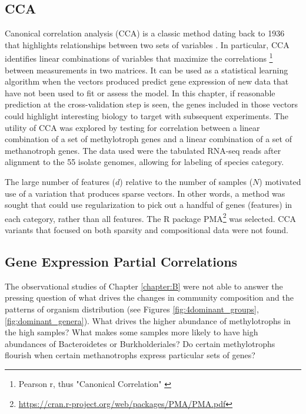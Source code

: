 \subsection{CCA}
Canonical correlation analysis (CCA) is a classic method dating back to 1936 \cite{hotelling1936} that highlights relationships between two sets of variables \cite{sherry2005}.
In particular, CCA identifies linear combinations of variables that maximize the correlations \footnote{Pearson r, thus "Canonical Correlation" \cite{sherry2005}} between measurements in two matrices.
It can be used as a statistical learning algorithm when the vectors produced predict gene expression of new data that have not been used to fit or assess the model.
In this chapter, if reasonable prediction at the cross-validation step is seen, the genes included in those vectors could highlight interesting biology to target with subsequent experiments.
The utility of CCA was explored by testing for correlation between a linear combination of a set of methylotroph genes and a linear combination of a set of methanotroph genes.
The data used were the tabulated RNA-seq reads after alignment to the 55 isolate genomes, allowing for labeling of species category.

The large number of features ($d$) relative to the number of samples ($N$) motivated use of a variation that produces sparse vectors.
In other words, a method was sought that could use regularization to pick out a handful of genes (features) in each category, rather than all features.
The R package PMA\footnote{\url{https://cran.r-project.org/web/packages/PMA/PMA.pdf}} \cite{witten2009} was selected.
CCA variants that focused on both sparsity and compositional data were not found.

\subsection{Gene Expression Partial Correlations}

The observational studies of Chapter \ref{chapter:B} were not able to answer the pressing question of what drives the changes in community composition and the patterns of organism distribution (see Figures \ref{fig:4dominant_groups}, \ref{fig:dominant_genera}).
What drives the higher abundance of methylotrophs in the high  samples?
What makes some samples more likely to have high abundances of Bacteroidetes or Burkholderiales?
Do certain methylotrophs flourish when certain methanotrophs express particular sets of genes?

